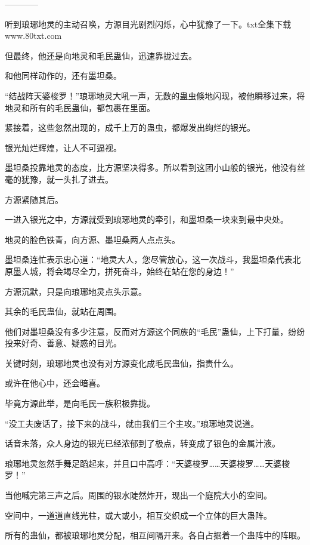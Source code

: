 
\begin{this_body}

------------

听到琅琊地灵的主动召唤，方源目光剧烈闪烁，心中犹豫了一下。txt全集下载www.80txt.com

但最终，他还是向地灵和毛民蛊仙，迅速靠拢过去。

和他同样动作的，还有墨坦桑。

“结战阵天婆梭罗！”琅琊地灵大吼一声，无数的蛊虫倏地闪现，被他瞬移过来，将地灵和所有的毛民蛊仙，都包裹在里面。

紧接着，这些忽然出现的，成千上万的蛊虫，都爆发出绚烂的银光。

银光灿烂辉煌，让人不可逼视。

墨坦桑投靠地灵的态度，比方源坚决得多。所以看到这团小山般的银光，他没有丝毫的犹豫，就一头扎了进去。

方源紧随其后。

一进入银光之中，方源就受到琅琊地灵的牵引，和墨坦桑一块来到最中央处。

地灵的脸色铁青，向方源、墨坦桑两人点点头。

墨坦桑连忙表示忠心道：“地灵大人，您尽管放心，这一次战斗，我墨坦桑代表北原墨人城，将会竭尽全力，拼死奋斗，始终在站在您的身边！”

方源沉默，只是向琅琊地灵点头示意。

其余的毛民蛊仙，就站在周围。

他们对墨坦桑没有多少注意，反而对方源这个同族的“毛民”蛊仙，上下打量，纷纷投来好奇、善意、疑惑的目光。

关键时刻，琅琊地灵也没有对方源变化成毛民蛊仙，指责什么。

或许在他心中，还会暗喜。

毕竟方源此举，是向毛民一族积极靠拢。

“没工夫废话了，接下来的战斗，就由我们三个主攻。”琅琊地灵说道。

话音未落，众人身边的银光已经浓郁到了极点，转变成了银色的金属汁液。

琅琊地灵忽然手舞足蹈起来，并且口中高呼：“天婆梭罗……天婆梭罗……天婆梭罗！”

当他喊完第三声之后。周围的银水陡然炸开，现出一个庭院大小的空间。

空间中，一道道直线光柱，或大或小，相互交织成一个立体的巨大蛊阵。

所有的蛊仙，都被琅琊地灵分配，相互间隔开来。各自占据着一个蛊阵中的阵眼。


\end{this_body}
